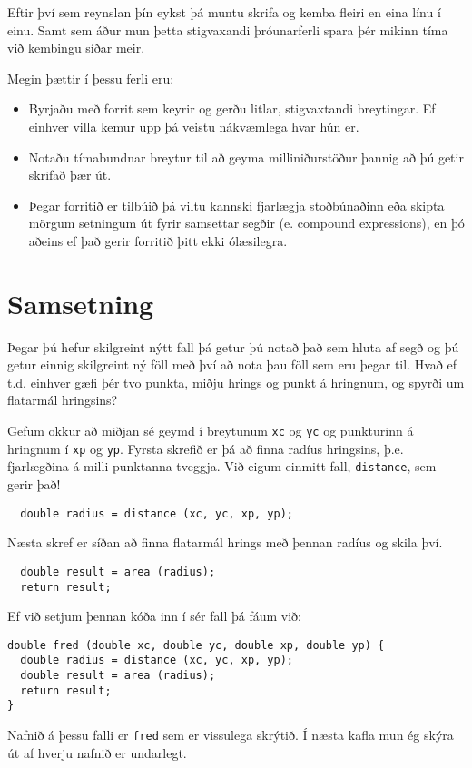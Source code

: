 Eftir því sem reynslan þín eykst þá muntu skrifa og kemba fleiri en eina línu í einu.
Samt sem áður mun þetta stigvaxandi þróunarferli spara þér mikinn tíma við kembingu síðar meir.

Megin þættir í þessu ferli eru:

\begin{itemize}

\item Byrjaðu með forrit sem keyrir og gerðu litlar, stigvaxtandi breytingar.
Ef einhver villa kemur upp þá veistu nákvæmlega hvar hún er.

\item Notaðu tímabundnar breytur til að geyma milliniðurstöður þannig að þú getir skrifað þær út.

\item Þegar forritið er tilbúið þá viltu kannski fjarlægja stoðbúnaðinn eða skipta mörgum setningum út fyrir samsettar segðir (e. compound expressions), en þó aðeins ef það gerir forritið þitt ekki ólæsilegra.

\end{itemize}

\section{Samsetning}

Þegar þú hefur skilgreint nýtt fall þá getur þú notað það sem hluta af segð og þú getur einnig skilgreint ný föll með því að nota þau föll sem eru þegar til.
Hvað ef t.d. einhver gæfi þér tvo punkta, miðju hrings og punkt á hringnum, og spyrði um flatarmál hringsins?

Gefum okkur að miðjan sé geymd í breytunum {\tt xc} og {\tt yc} og punkturinn á hringnum í {\tt xp} og {\tt yp}.
Fyrsta skrefið er þá að finna radíus hringsins, þ.e. fjarlægðina á milli punktanna tveggja.
Við eigum einmitt fall, {\tt distance}, sem gerir það!

\begin{verbatim}
  double radius = distance (xc, yc, xp, yp);
\end{verbatim}
%
Næsta skref er síðan að finna flatarmál hrings með þennan radíus og skila því.

\begin{verbatim}
  double result = area (radius);
  return result;
\end{verbatim}
%
Ef við setjum þennan kóða inn í sér fall þá fáum við:

\begin{verbatim}
double fred (double xc, double yc, double xp, double yp) {
  double radius = distance (xc, yc, xp, yp);
  double result = area (radius);
  return result;
} 
\end{verbatim}
%
Nafnið á þessu falli er {\tt fred} sem er vissulega skrýtið.
Í næsta kafla mun ég skýra út af hverju nafnið er undarlegt.

